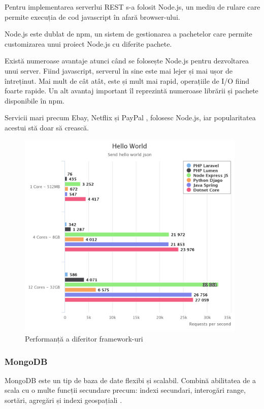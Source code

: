 \documentclass[12pt]{article}
\begin{document}
Pentru implementarea serverlui REST s-a folosit
Node.js, un mediu de rulare care permite execuția de cod
javascript în afară browser-ului.

Node.js este dublat de npm, un sistem de gestionarea a pachetelor
care permite customizarea unui proiect Node.js cu diferite pachete.

Există numeroase avantaje atunci când se folosește Node.js pentru dezvoltarea unui server.
Fiind javascript, serverul în sine este mai lejer și mai ușor de întreținut. Mai mult
de cât atât, este și mult mai rapid, operațiile de I/O fiind foarte rapide.
Un alt avantaj important îl reprezintă numeroase librării și pachete disponibile în npm.

Servicii mari precum Ebay, Netflix și PayPal \cite{tilkov2010node}, folosesc Node.js, iar popularitatea
acestui stă doar să crească.

\begin{figure}[H]
\centering
\includegraphics[height=10cm]{nodespeed.png}
\caption{Performanță a diferitor framework-uri \cite{reqpersec}}
\end{figure}

\newpage
\subsubsection{MongoDB}

MongoDB este un tip de baza de date flexibi și scalabil. Combină abilitatea
de a scala cu o multe funcții secundare precum: indexi secundari, interogări range,
sortări, agregări și indexi geospațiali \cite{banker2011mongodb}.
\end{document}
